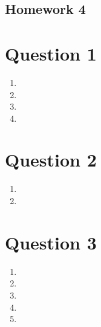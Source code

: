 \documentclass[11pt, oneside]{article}   	%
\begin{document}
\begin{center}
\section*{Homework 4}
\end{center}

\begin{flushleft}

\section*{Question 1}
\begin{enumerate}
    \item %
    \item %
    \item %
    \item %
\end{enumerate}
\newpage
\section*{Question 2}
\begin{enumerate}
    \item %
    \item %
\end{enumerate}
\newpage
\section*{Question 3}
\begin{enumerate}
    \item %
    \item %
    \item %
    \item %
    \item %
\end{enumerate}
\end{flushleft}
\end{document}
